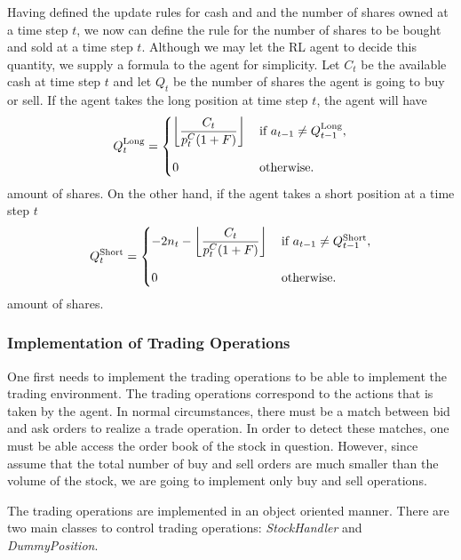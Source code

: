 \documentclass[conference]{IEEEtran}
\DeclarePairedDelimiter\floor{\lfloor}{\rfloor}
\begin{document}
Having defined the update rules for cash and and the number of shares owned at a time step \(t\), we now can define the rule for the number of shares to be bought and sold at a time step \(t\). Although we may let the RL agent to decide this quantity, we supply a formula to the agent for simplicity.  Let \(C_t\) be the available cash at time step \(t\) and let \(Q_t\) be the number of shares the agent is going to buy or sell. If the agent takes the long position at time step \(t\), the agent will have 
\begin{equation}\label{eq:longaction}
    Q_t^{\text{Long}} =
    \begin{cases}
        \floor*{\dfrac{C_{t}}{p_t^C (1 + F)}} \, &\text{if} \,\, a_{t-1} \neq Q_{t-1}^{\text{Long}}, \\[15pt]
        0 \, &\text{otherwise}.
    \end{cases}
\end{equation} 
amount of shares. On the other hand, if the agent takes a short position at a time step \(t\)
\begin{equation}
    Q_t^{\text{Short}} =
    \begin{cases}
        -2 n_t - \floor*{\dfrac{C_{t}}{p_t^C (1 + F)}} \, &\text{if} \,\, a_{t-1} \neq Q_{t-1}^{\text{Short}}, \\[15pt]
        0 \, &\text{otherwise}.
    \end{cases}
\end{equation} 
amount of shares. 


\subsubsection{Implementation of Trading Operations}



One first needs to implement the trading operations to be able to implement the trading environment. The trading operations correspond to the actions that is taken by the agent. In normal circumstances, there must be a match between bid and ask orders to realize a trade operation. In order to detect these matches, one must be able access the order book of the stock in question. However, since assume that the total number of buy and sell orders are much smaller than the volume of the stock, we are going to implement only buy and sell operations. 

The trading operations are implemented in an object oriented manner. There are two main classes to control trading operations: \textit{StockHandler} and \textit{DummyPosition}. 
\end{document}
